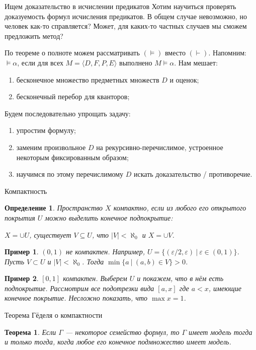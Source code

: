 \documentclass[aspectratio=169]{beamer}
\newtheorem{thm}{Теорема}[section]
\newtheorem{dfn}{Определение}[section]
\newtheorem{exm}{Пример}[section]
\begin{document}
\begin{frame}{Ищем доказательство в исчислении предикатов}
Хотим научиться проверять доказуемость формул исчисления предикатов.
В общем случае невозможно, но человек как-то справляется? Может,
для каких-то частных случаев мы сможем предложить метод? 

По теореме о полноте можем рассматривать $(\models)$ вместо $(\vdash)$. 
Напомним: $\models \alpha$, если для всех $M = \langle D, F, P, E \rangle$ выполнено $M \models \alpha$.
Нам мешает:
\begin{enumerate}
\item бесконечное множество предметных множеств $D$ и оценок;
\item бесконечный перебор для кванторов;
\end{enumerate}
Будем последовательно упрощать задачу:
\begin{enumerate}
\item упростим формулу;
\item заменим произвольное $D$ на рекурсивно-перечислимое, устроенное некоторым фиксированным образом;
\item научимся по этому перечислимому $D$ искать доказательство / противоречие.
\end{enumerate}
\end{frame}

\begin{frame}{Компактность}
\begin{dfn} 
Пространство $X$ компактно, если из любого его открытого покрытия $U$ можно выделить конечное подпокрытие:

$X = \cup U$, существует $V \subseteq U$, что $|V| < \aleph_0$ и $X = \cup V$.
\end{dfn}

\begin{exm}
$(0,1)$ не компактен. Например, $U = \{(\varepsilon/2,\varepsilon)\ |\ \varepsilon\in(0,1)\}$.
Пусть $V \subset U$ и $|V| < \aleph_0$. Тогда $\min \{ a\ |\ (a,b) \in V \} > 0$.
\end{exm}

\begin{exm}
$[0,1]$ компактен. Выберем $U$ и покажем, что в нём есть подпокрытие.
Рассмотрим все подотрезки вида $[a,x]$ где $a < x$, имеющие конечное покрытие.
Несложно показать, что $\max x = 1$.
\end{exm}
\end{frame}


\begin{frame}{Теорема Гёделя о компактности}
\begin{thm}Если $\Gamma$ --- некоторое семейство формул, то $\Gamma$ имеет модель
тогда и только тогда, когда любое его конечное подмножество имеет модель.\end{thm}
\end{frame}
\end{document}
